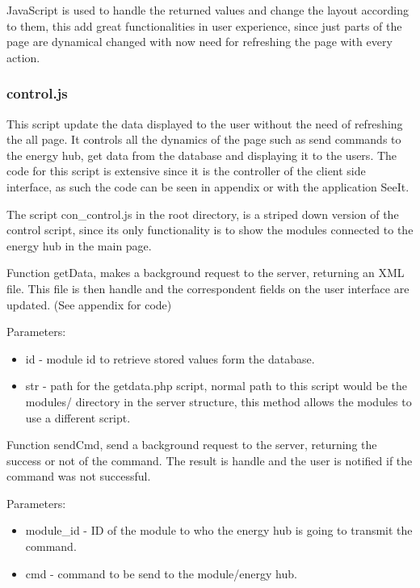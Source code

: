JavaScript is used to handle the returned values and change the layout according to them, this add great functionalities in user experience, since just parts of the page are dynamical changed with now need for refreshing the page with every action.

\subsubsection{control.js}
This script update the data displayed to the user without the need of refreshing the all page. It controls all the dynamics of the page such as send commands to the energy hub, get data from the database and displaying it to the users. The code for this script is extensive since it is the controller of the client side interface, as such the code can be seen in appendix or with the application SeeIt.

The script con\_control.js in the root directory, is a striped down version of the control script, since its only functionality is to show the modules connected to the energy hub in the main page.

Function getData, makes a background request to the server, returning an XML file. This file is then handle and the correspondent fields on the user interface are updated. (See appendix for code)

Parameters:
\begin{itemize}
	\item id - module id to retrieve stored values form the database.
	\item str - path for the getdata.php script, normal path to this script would be the modules/ directory in the server structure, this method allows the modules to use a different script.
\end{itemize}

Function sendCmd, send a background request to the server, returning the success or not of the command. The result is handle and the user is notified if the command was not successful. 

Parameters:
\begin{itemize}
	\item module\_id - ID of the module to who the energy hub is going to transmit the command.
	\item cmd - command to be send to the module/energy hub.
\end{itemize}